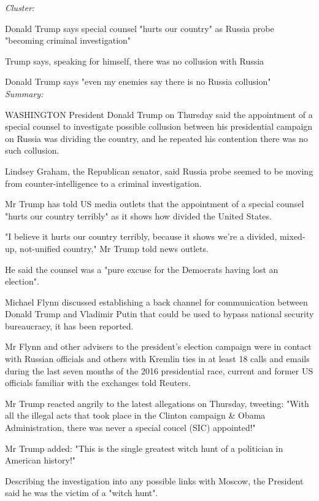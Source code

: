 \documentclass[12pt]{article}
\begin{document}
\begin{mdframed}

\emph{Cluster:}

Donald Trump says special counsel "hurts our country" as Russia probe "becoming criminal investigation" \cite{trump1}

Trump says, speaking for himself, there was no collusion with Russia \cite{trump2}

Donald Trump says "even my enemies say there is no Russia collusion" \cite{trump3} \\

\emph{Summary:}

WASHINGTON President Donald Trump on Thursday said the appointment of a special counsel to investigate possible collusion between his presidential campaign on Russia was dividing the country, and he repeated his contention there was no such collusion.

Lindsey Graham, the Republican senator, said Russia probe seemed to be moving from counter-intelligence to a criminal investigation.

Mr Trump has told US media outlets that the appointment of a special counsel "hurts our country terribly" as it shows how divided the United States.

"I believe it hurts our country terribly, because it shows we're a divided, mixed-up, not-unified country," Mr Trump told news outlets.

He said the counsel was a "pure excuse for the Democrats having lost an election".

Michael Flynn discussed establishing a back channel for communication between Donald Trump and Vladimir Putin that could be used to bypass national security bureaucracy, it has been reported.

Mr Flynn and other advisers to the president's election campaign were in contact with Russian officials and others with Kremlin ties in at least 18 calls and emails during the last seven months of the 2016 presidential race, current and former US officials familiar with the exchanges told Reuters.

Mr Trump reacted angrily to the latest allegations on Thursday, tweeting: "With all the illegal acts that took place in the Clinton campaign \& Obama Administration, there was never a special coucel (SIC) appointed!"

Mr Trump added: "This is the single greatest witch hunt of a politician in American history!"

Describing the investigation into any possible links with Moscow, the President said he was the victim of a "witch hunt".


\end{mdframed}
\end{document}
